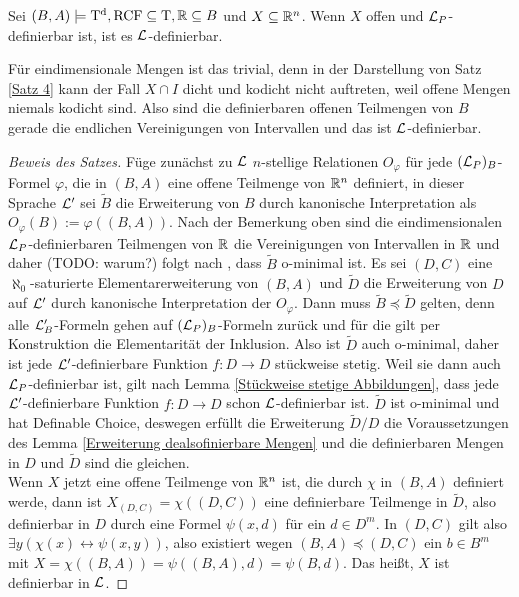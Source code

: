 \begin{theorem}
	Sei $(B,A)\models\operatorname{T^d},\operatorname{RCF}\subseteq\operatorname{T},\mathbb{R}\subseteq B$ und $X\subseteq \mathbb{R}^n$. Wenn $X$ offen und $\mathcal{L}_P$-definierbar ist, ist es $\mathcal{L}$-definierbar.
\end{theorem}
\begin{remark}
	Für eindimensionale Mengen ist das trivial, denn in der Darstellung von Satz \ref{Satz 4} kann der Fall $X\cap I$ dicht und kodicht nicht auftreten, weil offene Mengen niemals kodicht sind. Also sind die definierbaren offenen Teilmengen von $B$ gerade die endlichen Vereinigungen von Intervallen und das ist $\mathcal{L}$-definierbar.
\end{remark}
\begin{proof}[Beweis des Satzes]
	Füge zunächst zu $\mathcal{L}$ $n$-stellige Relationen $O_\varphi$ für jede $(\mathcal{L}_P)_B$-Formel $\varphi$, die in $(B,A)$ eine offene Teilmenge von $\mathbb{R}^n$ definiert, in dieser Sprache $\mathcal{L}'$ sei $\tilde{B}$ die Erweiterung von $B$ durch kanonische Interpretation als $O_\varphi(B):=\varphi((B,A))$. Nach der Bemerkung oben sind die eindimensionalen $\mathcal{L}_P$-definierbaren Teilmengen von $\mathbb{R}$ die Vereinigungen von Intervallen in $\mathbb{R}$ und daher (TODO: warum?) folgt nach \cite{MillSpeiss}, dass $\tilde{B}$ o-minimal ist. Es sei $(D,C)$ eine $\aleph_0$-saturierte Elementarerweiterung von $(B,A)$ und $\tilde{D}$ die Erweiterung von $D$ auf $\mathcal{L}'$ durch kanonische Interpretation der $O_\varphi$. Dann muss $\tilde{B}\preceq\tilde{D}$ gelten, denn alle $\mathcal{L}'_B$-Formeln gehen auf $(\mathcal{L}_P)_B$-Formeln zurück und für die gilt per Konstruktion die Elementarität der Inklusion. Also ist $\tilde{D}$ auch o-minimal, daher ist jede $\mathcal{L}'$-definierbare Funktion $f:D\rightarrow D$ stückweise stetig. Weil sie dann auch $\mathcal{L}_P$-definierbar ist, gilt nach Lemma \ref{Stückweise stetige Abbildungen}, dass jede $\mathcal{L}'$-definierbare Funktion $f:D\rightarrow D$ schon $\mathcal{L}$-definierbar ist. $\tilde{D}$ ist o-minimal und hat Definable Choice, deswegen erfüllt die Erweiterung $\tilde{D}/D$ die Voraussetzungen des Lemma \ref{Erweiterung dealsofinierbare Mengen} und die definierbaren Mengen in $D$ und $\tilde{D}$ sind die gleichen.\\
	Wenn $X$ jetzt eine offene Teilmenge von $\mathbb{R}^n$ ist, die durch $\chi$ in $(B,A)$ definiert werde, dann ist $X_{(D,C)}=\chi((D,C))$ eine definierbare Teilmenge in $\tilde{D}$, also definierbar in $D$ durch eine Formel $\psi(x,d)$ für ein $d\in D^m$. In $(D,C)$ gilt also $\exists y(\chi(x)\leftrightarrow\psi(x,y))$, also existiert wegen $(B,A)\preceq(D,C)$ ein $b\in B^m$ mit $X=\chi((B,A))=\psi((B,A),d)=\psi(B,d)$. Das heißt, $X$ ist definierbar in $\mathcal{L}$.
\end{proof}
